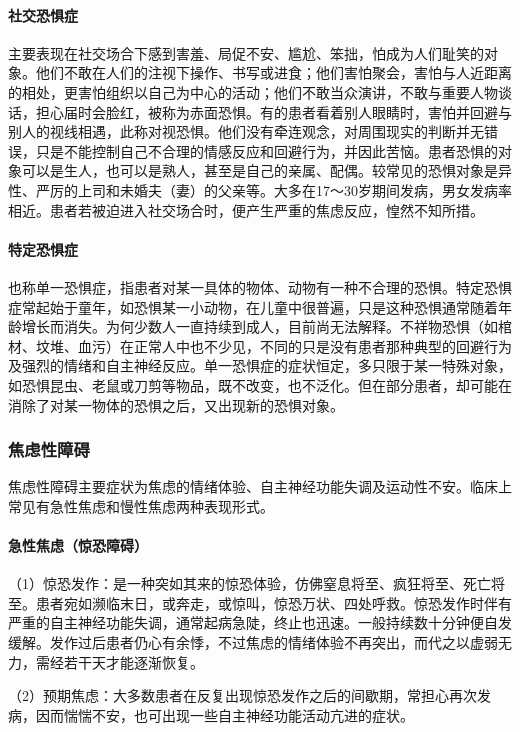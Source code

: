 \paragraph{社交恐惧症}

主要表现在社交场合下感到害羞、局促不安、尴尬、笨拙，怕成为人们耻笑的对象。他们不敢在人们的注视下操作、书写或进食；他们害怕聚会，害怕与人近距离的相处，更害怕组织以自己为中心的活动；他们不敢当众演讲，不敢与重要人物谈话，担心届时会脸红，被称为赤面恐惧。有的患者看着别人眼睛时，害怕并回避与别人的视线相遇，此称对视恐惧。他们没有牵连观念，对周围现实的判断并无错误，只是不能控制自己不合理的情感反应和回避行为，并因此苦恼。患者恐惧的对象可以是生人，也可以是熟人，甚至是自己的亲属、配偶。较常见的恐惧对象是异性、严厉的上司和未婚夫（妻）的父亲等。大多在17～30岁期间发病，男女发病率相近。患者若被迫进入社交场合时，便产生严重的焦虑反应，惶然不知所措。
\paragraph{特定恐惧症}

也称单一恐惧症，指患者对某一具体的物体、动物有一种不合理的恐惧。特定恐惧症常起始于童年，如恐惧某一小动物，在儿童中很普遍，只是这种恐惧通常随着年龄增长而消失。为何少数人一直持续到成人，目前尚无法解释。不祥物恐惧（如棺材、坟堆、血污）在正常人中也不少见，不同的只是没有患者那种典型的回避行为及强烈的情绪和自主神经反应。单一恐惧症的症状恒定，多只限于某一特殊对象，如恐惧昆虫、老鼠或刀剪等物品，既不改变，也不泛化。但在部分患者，却可能在消除了对某一物体的恐惧之后，又出现新的恐惧对象。

\subsubsection{焦虑性障碍}

焦虑性障碍主要症状为焦虑的情绪体验、自主神经功能失调及运动性不安。临床上常见有急性焦虑和慢性焦虑两种表现形式。
\paragraph{急性焦虑（惊恐障碍）}

（1）惊恐发作：是一种突如其来的惊恐体验，仿佛窒息将至、疯狂将至、死亡将至。患者宛如濒临末日，或奔走，或惊叫，惊恐万状、四处呼救。惊恐发作时伴有严重的自主神经功能失调，通常起病急陡，终止也迅速。一般持续数十分钟便自发缓解。发作过后患者仍心有余悸，不过焦虑的情绪体验不再突出，而代之以虚弱无力，需经若干天才能逐渐恢复。

（2）预期焦虑：大多数患者在反复出现惊恐发作之后的间歇期，常担心再次发病，因而惴惴不安，也可出现一些自主神经功能活动亢进的症状。

